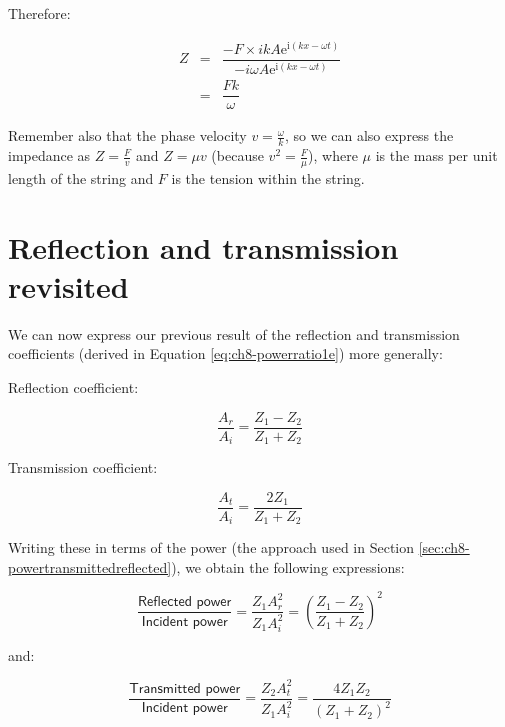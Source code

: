\documentclass[
]{book}
\begin{document}
Therefore:

\begin{equation}
\begin{array}{rcl}
Z &=& \dfrac{-F \times ik A \mathrm{e}^{\mathrm{i}(kx - \omega t)}}{-i \omega A \mathrm{e}^{\mathrm{i}(kx - \omega t)}}\\
  &=& \dfrac{Fk}{\omega}
\end{array}
\end{equation}

Remember also that the phase velocity \(v = \frac{\omega}{k}\), so we can also express the impedance as \(Z = \frac{F}{v}\) and \(Z = \mu v\) (because \(v^2 = \frac{F}{\mu}\)), where \(\mu\) is the mass per unit length of the string and \(F\) is the tension within the string.

\hypertarget{sec:ch8-reflecttrans2}{%
\section{Reflection and transmission revisited}\label{sec:ch8-reflecttrans2}}

We can now express our previous result of the reflection and transmission coefficients (derived in Equation \eqref{eq:ch8-powerratio1e}) more generally:

Reflection coefficient:

\begin{equation}
\frac{A_r}{A_i} = \frac{Z_1 - Z_2}{Z_1 + Z_2}
\label{eq:ch8-reflectioncoeff1}
\end{equation}

Transmission coefficient:

\begin{equation}
\frac{A_t}{A_i} = \frac{2 Z_1 }{Z_1 + Z_2}
\label{eq:ch8-transmissioncoeff1}
\end{equation}

Writing these in terms of the power (the approach used in Section \ref{sec:ch8-powertransmittedreflected}), we obtain the following expressions:

\begin{equation}
\frac{\textsf{Reflected power}}{\textsf{Incident power}} = \frac{Z_1 A_r^2}{ Z_1 A_i^2} = \left(\frac{Z_1 - Z_2}{Z_1 + Z_2}\right)^2
\label{eq:ch8-reflectioncoeff2}
\end{equation}

and:

\begin{equation}
\frac{\textsf{Transmitted power}}{\textsf{Incident power}} = \frac{Z_2 A_t^2}{ Z_1 A_i^2} = \frac{4 Z_1 Z_2}{(Z_1 + Z_2)^2}
\label{eq:ch8-transmissioncoeff2}
\end{equation}
\end{document}
